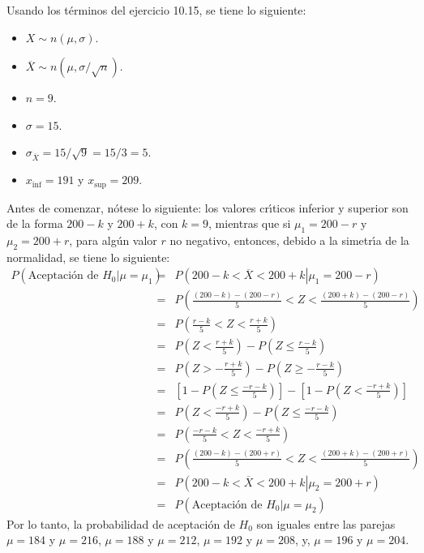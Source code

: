 \begin{solucion}
 Usando los t\'erminos del ejercicio 10.15, se tiene lo siguiente:
 \begin{itemize}
  \item $X \sim n(\mu, \sigma)$.
  \item $\overline{X} \sim n\left( \mu, \sigma/\sqrt{n} \right)$.
  \item $n = 9$.
  \item $\sigma = 15$.
  \item $\sigma_{\overline{X}} = 15/\sqrt{9} = 15/3 = 5$.
  \item $x_{\text{inf}} = 191$ y $x_{\text{sup}} = 209$.
 \end{itemize}
 Antes de comenzar, n\'otese lo siguiente: los valores cr\'{\i}ticos inferior y superior son de la forma $200-k$ y $200+k$, con $k = 9$, mientras que si $\mu_1 = 200 - r$ y $\mu_2 = 200 + r$, para alg\'un valor $r$ no negativo, entonces, debido a la simetr\'{\i}a de la normalidad, se tiene lo siguiente:
 \begin{eqnarray*}
  P(\left. \text{Aceptaci\'on de } H_0 \right| \mu =\mu_1 ) & = & P\left( \left. 200 - k < \overline{X} < 200 + k \right| \mu_1 = 200 - r \right) \\
  & = & P\left( \frac{(200-k) - (200-r)}{5} < Z < \frac{(200+k) - (200-r)}{5} \right) \\
  & = & P\left( \frac{r-k}{5} < Z < \frac{r + k}{5} \right) \\
  & = & P\left( Z < \frac{r+k}{5} \right) - P\left( Z \leq \frac{r - k}{5} \right) \\
  & = & P\left( Z > -\frac{r+k}{5} \right) - P\left( Z \geq -\frac{r-k}{5} \right) \\
  & = & \left[ 1 - P\left( Z \leq \frac{-r-k}{5} \right) \right] - \left[ 1 - P\left( Z < \frac{-r+k}{5} \right) \right] \\
  & = & P\left( Z < \frac{-r+k}{5} \right) - P\left( Z \leq \frac{-r-k}{5} \right) \\
  & = & P\left( \frac{-r-k}{5} < Z < \frac{-r+k}{5} \right) \\
  & = & P\left( \frac{(200-k)-(200+r)}{5} < Z < \frac{(200+k)-(200+r)}{5} \right) \\
  & = & P\left( \left. 200-k < \overline{X} < 200+k \right| \mu_2 = 200+r \right) \\
  & = & P(\text{Aceptaci\'on de } H_0 | \mu = \mu_2)
 \end{eqnarray*}
 Por lo tanto, la probabilidad de aceptaci\'on de $H_0$ son iguales entre las parejas $\mu = 184$ y $\mu = 216$, $\mu = 188$ y $\mu = 212$, $\mu = 192$ y $\mu = 208$, y, $\mu = 196$ y $\mu = 204$.

\end{solucion}
